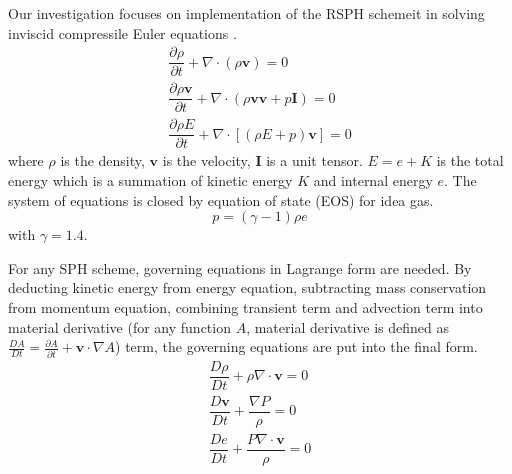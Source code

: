 \documentclass[review]{elsarticle}
\begin{document}
Our investigation focuses on implementation of the RSPH schemeit in solving inviscid compressile Euler equations .  
\begin{align}
\dfrac{\partial \rho}{\partial t} + \nabla \cdot \left(\rho \textbf{v} \right) = 0 \label{eq:gov-cs-rho} \\
\dfrac{\partial \rho \textbf{v}}{\partial t} + \nabla \cdot \left(\rho \textbf{v} \textbf{v} + p\textbf{I}\right) = 0 \label{eq:gov-cs-v} \\
\dfrac{\partial \rho E}{\partial t} + \nabla \cdot \left[\left(\rho E + p \right)\textbf{v}\right] = 0 \label{eq:gov-cs-e}
\end{align}
where $\rho$ is the density, $\textbf{v}$ is the velocity, $\textbf{I}$ is a unit tensor.
$E = e + K $ is the total energy which is a summation of kinetic energy $K$ and internal energy $e$.
The system of equations is closed by equation of state (EOS) for idea gas.
\begin{equation}
p = \left(\gamma - 1\right)\rho e \label{eq:EOS}
\end{equation}
with $\gamma=1.4$.

For any SPH scheme, governing equations in Lagrange form are needed. By deducting kinetic energy from energy equation, subtracting mass conservation from momentum equation, combining transient term and advection term into material derivative (for any function $A$, material derivative is defined as $\frac{D A}{Dt} = \frac{\partial A}{\partial t} + \textbf{v} \cdot \nabla A$) term, the governing equations are put into the final form. 
\begin{align}
\dfrac{D \rho}{D t} + \rho \nabla \cdot \textbf{v} = 0 \label{eq:gov-nc-rho}\\
\dfrac{D \textbf{v}}{D t} + \dfrac{\nabla P}{\rho} =0 \label{eq:gov-nc-v}\\
\dfrac{D e}{D t} + \dfrac{P \nabla \cdot \textbf{v}}{\rho} = 0 \label{eq:gov-nc-e}
\end{align}
\end{document}
